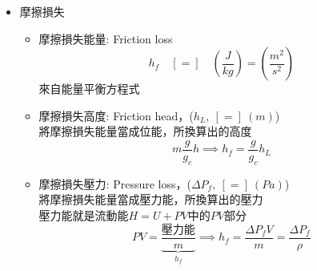 \documentclass[../main.tex]{subfiles}
\begin{document}
\begin{itemize}
\begin{itemize}
\begin{equation}
\begin{cases}
        \text{Re}_{t,x} > 3\times 10^{6} & \text{Turbulent flow} 
      \end{cases}
    \end{equation}
    \item  管內(包含非圓管)流動
      \begin{equation}
        \begin{cases}
          \text{Re} < 2100 & \text{Laminar flow} \\
          \text{Re} > 4000 & \text{Turbulent flow}
        \end{cases}
      \end{equation}
    \item $\boxed{\text{Re} < 2100}$\\
    在此區域中，摩擦因子與雷諾數成反比
    \begin{equation}
      f_F = \frac{16}{\text{Re}}
    \end{equation}
    \\
    此之前斜率為-1，截距為$\log 16$
    \item $\boxed{\text{Re} > 4000}$\\
    在此區域中，摩擦因子與雷諾數無關
  \end{itemize}
  \item 摩擦損失
  \begin{itemize}
    \item 摩擦損失能量: Friction loss
    \begin{equation}
      h_f \quad[=] \quad \left(
        \frac{J}{kg}
      \right)  = \left(
        \frac{m^2}{s^2}
      \right)
    \end{equation}
    來自能量平衡方程式
    \item 摩擦損失高度: Friction head，($h_L,~[=]~(m)$)\\
    將摩擦損失能量當成位能，所換算出的高度
    \begin{equation}
      m\frac{g}{g_c}h \implies \boxed{h_f = \frac{g}{g_c} h_L}
    \end{equation}
    \item 摩擦損失壓力: Pressure loss，($\Delta P_f,~[=]~(Pa)$)\\
    將摩擦損失能量當成壓力能，所換算出的壓力\\
    壓力能就是流動能$H=U+PV$中的$PV$部分
    \begin{equation}
      PV = \underbrace{\frac{\text{壓力能}}{m}}_{h_f} \implies \boxed{h_f = \frac{\Delta P_f V}{m} = \frac{\Delta P_f}{\rho}}
    \end{equation}

\end{itemize}
\end{itemize}
\end{document}
